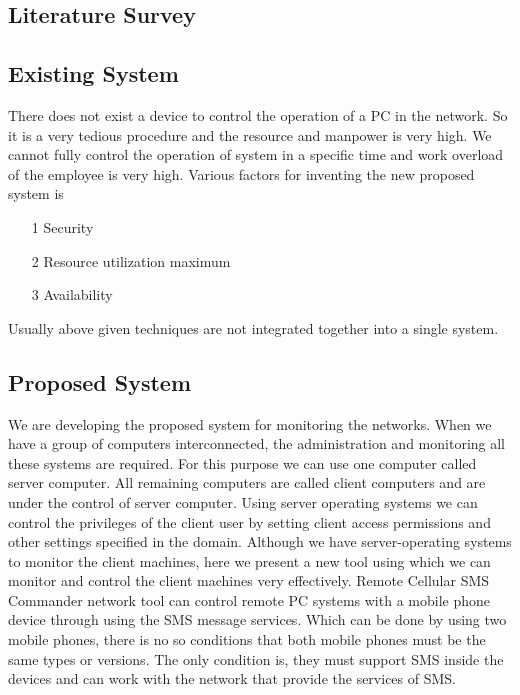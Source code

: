 \newpage
\begin{center}

\section{Literature Survey}
\end{center}
\subsection{Existing System}
There does not exist a device to control the operation of a PC
in the network. So it is a very tedious procedure and the resource and manpower is very
high. We cannot fully control the operation of system in a specific time and work overload
of the employee is very high. Various factors for inventing the new proposed system is
\begin{itemize}

\item[1]Security 
\item[2]Resource utilization maximum
\item[3]Availability
\end{itemize}
Usually above given techniques are not integrated together into a single system.
\subsection{Proposed System}
We are developing the proposed system for monitoring the networks. When we have a
group of computers interconnected, the administration and monitoring all these systems
are required. For this purpose we can use one computer called server computer. All
remaining computers are called client computers and are under the control of server
computer. Using server operating systems we can control the privileges of the client user
by setting client access permissions and other settings specified in the domain. Although
we have server-operating systems to monitor the client machines, here we present a new
tool using which we can monitor and control the client machines very effectively. Remote
Cellular SMS Commander network tool can control remote PC systems with a mobile
phone device through using the SMS message services. Which can be done by using two
mobile phones, there is no so conditions that both mobile phones must be the same types or versions. The only condition is, they must support SMS inside the devices and can
work with the network that provide the services of SMS.

